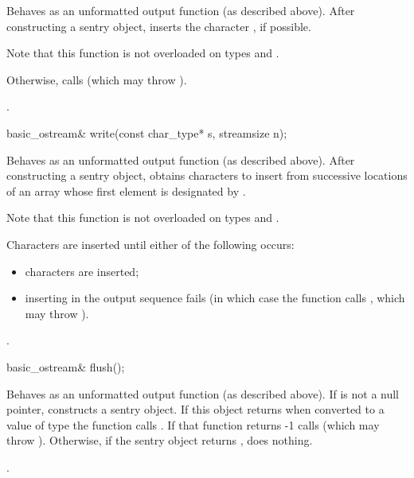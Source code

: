 \begin{itemdescr}
\pnum
\effects
Behaves as an unformatted output function (as described above).
After constructing a sentry
object, inserts
the character , if possible.
\begin{footnote}
Note that this function is not overloaded on types
and
.
\end{footnote}

\pnum
Otherwise, calls
(which may throw
).

\pnum
\returns
{}.
\end{itemdescr}

%
\begin{itemdecl}
basic_ostream& write(const char_type* s, streamsize n);
\end{itemdecl}

\begin{itemdescr}
\pnum
\effects
Behaves as an unformatted output function (as described above).  After constructing a sentry
object, obtains
characters to insert from
successive locations of an array whose first element is designated by
.
\begin{footnote}
Note that this function is not overloaded on types
and
.
\end{footnote}
Characters are inserted until either of the following occurs:
\begin{itemize}
\item
{} characters are inserted;
\item
inserting in the output sequence fails
(in which case the function calls
,
which may throw
).
\end{itemize}

\pnum
\returns
{}.
\end{itemdescr}

%
\begin{itemdecl}
basic_ostream& flush();
\end{itemdecl}

\begin{itemdescr}
\pnum
\effects
Behaves as an unformatted output function (as described above).
If
is not a null pointer,
constructs a sentry object. If this object returns  when converted to a value of type  the function
calls
.
If that function returns -1
calls
(which may throw
).
Otherwise, if the sentry object returns , does nothing.

\pnum
\returns
{}.
\end{itemdescr}

